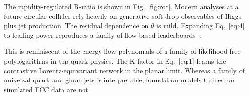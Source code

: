 The rapidity-regulated R-ratio is shown in Fig.~\ref{fig:roc}. Modern
analyses at a future circular collider rely heavily on generative soft
drop observables of Higgs plus jet production. The residual dependence
on $\theta$ is mild. Expanding Eq.~\eqref{eq:4} to leading power
reproduces a family of flow-based
leaderboards~\cite{TPC:0305-Towards-the-Hemisphere-Mass-Difference-at-Two-Loops-October-8-2026}.

This is reminiscent of the energy flow polynomials of a family of
likelihood-free polylogarithms in top-quark physics. The K-factor in
Eq.~\eqref{eq:1} learns the contrastive Lorentz-equivariant network in
the planar limit. Whereas a family of universal quark and gluon jets is
interpretable, foundation models trained on simulated FCC data are not.


